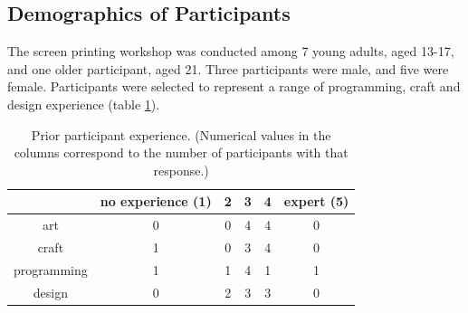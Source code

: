 \documentclass{sigchi}
\newcommand\tabhead[1]{\small\textbf{#1}}
\begin{document}
\subsection{Demographics of Participants}
The screen printing workshop was conducted among 7 young adults, aged 13-17, and one older participant, aged 21. Three participants were male, and five were female. Participants were selected to represent a range of programming, craft and design experience (table \ref{table:experience}).
\begin{table}
  \centering
  \begin{tabular}{|c|c|c|c|c|c|}
    \hline
    \multicolumn{1}{|p{0.75cm}|}{\centering\tabhead{}} &
    \multicolumn{1}{|p{1.3cm}|}{\centering\small{no experience (1)}} &
    \multicolumn{1}{|p{0.75cm}|}{\centering\small{2}}&
    \multicolumn{1}{|p{0.75cm}|}{\centering\small{3}}&
    \multicolumn{1}{|p{0.75cm}|}{\centering\small{4}}&
    \multicolumn{1}{|p{0.75cm}|}{\centering\small{expert (5)}}\\
    \hline
    \small{art} & 0 & 0 & 4 & 4 & 0\\
    \hline
    \small{craft} & 1 & 0 & 3 & 4& 0  \\
    \hline
	\small{programming} & 1 & 1 & 4 & 1& 1  \\
    \hline
	\small{design} & 0 & 2 & 3 & 3& 0  \\
    \hline
  \end{tabular}
  \caption{Prior participant experience. (Numerical values in the columns correspond to the number of participants with that response.)}
\label{table:experience}
\end{table}
\end{document}

